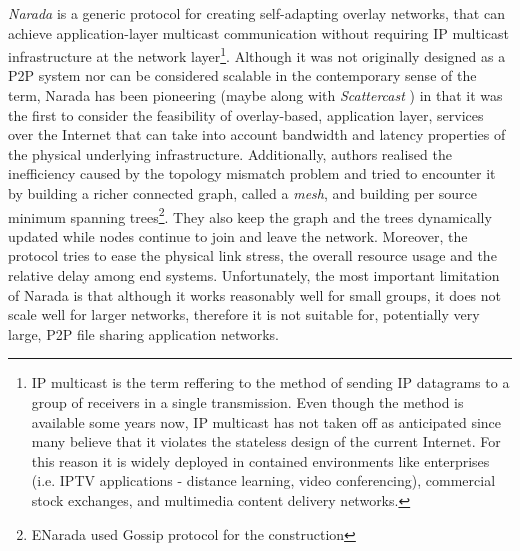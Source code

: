 
\emph{Narada} \cite{CRZ2000,CRSZ2001,CRSZ2002} is a generic
protocol for creating self-adapting overlay networks, that can achieve
application-layer multicast communication without requiring IP multicast
infrastructure at the network layer\footnote{
  IP multicast is the term reffering to the method of sending IP datagrams to a
  group of receivers in a single transmission. Even though the method is
  available some years now, IP multicast has not taken off as anticipated since
  many believe that it violates the stateless design of the current Internet.
  For this reason it is widely deployed in contained environments like
  enterprises (i.e. IPTV applications - distance learning, video conferencing),
  commercial stock exchanges, and multimedia content delivery networks.
}. Although it was not originally designed as a P2P system nor can be considered
scalable in the contemporary sense of the term, Narada has been pioneering
(maybe along with \emph{Scattercast} \cite{C2000}) in that
it was the first to consider the feasibility of overlay-based, application
layer, services over the Internet that can take into account bandwidth and
latency properties of the physical underlying infrastructure. Additionally,
authors realised the inefficiency caused by the topology mismatch problem and
tried to encounter it by building a richer connected graph, called a
\emph{mesh}, and building per source minimum spanning trees\footnote{
  ENarada \cite{LYL2008} used Gossip protocol for the
construction
}.
They also keep the graph and the trees
dynamically updated while nodes continue to join and leave the network.
Moreover, the protocol tries to ease the physical link stress, the overall
resource usage and the relative delay among end systems. Unfortunately, the most
important limitation of Narada is that although it works reasonably well for
small groups, it does not scale well for larger networks, therefore it is not
suitable for, potentially very large, P2P file sharing application networks.

